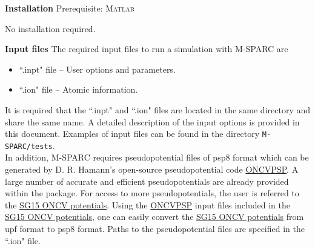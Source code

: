 \documentclass[xcolor=dvipsnames,t]{beamer}
\begin{document}
\begin{frame}{\textbf{Installation}} \label{Installation}
Prerequisite: \textsc{Matlab}

No installation required.
\end{frame}


\begin{frame}[allowframebreaks]{\textbf{Input files}} \label{Inputfiles}
The required input files to run a simulation with M-SPARC are
\begin{itemize}
  \item ``.inpt" file -- User options and parameters.
  \item ``.ion" file -- Atomic information.
\end{itemize}
It is required that the ``.inpt" and ``.ion" files are located in the same directory and share the same name. A detailed description of the input options is provided in this document. Examples of input files can be found in the directory \texttt{M-SPARC/tests}. \\
In addition, M-SPARC requires pseudopotential files of psp8 format which can be generated by D. R. Hamann's open-source pseudopotential code \href{http://www.mat-simresearch.com/}{ONCVPSP}. A large number of accurate and efficient pseudopotentials are already provided within the package. For access to more pseudopotentials, the user is referred to the \href{http://www.quantum-simulation.org/potentials/sg15_oncv/}{SG15 ONCV potentials}. Using the \href{http://www.mat-simresearch.com/}{ONCVPSP} input files included in the \href{http://www.quantum-simulation.org/potentials/sg15_oncv/}{SG15 ONCV potentials}, one can easily convert the \href{http://www.quantum-simulation.org/potentials/sg15_oncv/}{SG15 ONCV potentials} from upf format to psp8 format. Paths to the pseudopotential files are specified in the ``.ion" file.
\end{frame}
\end{document}

